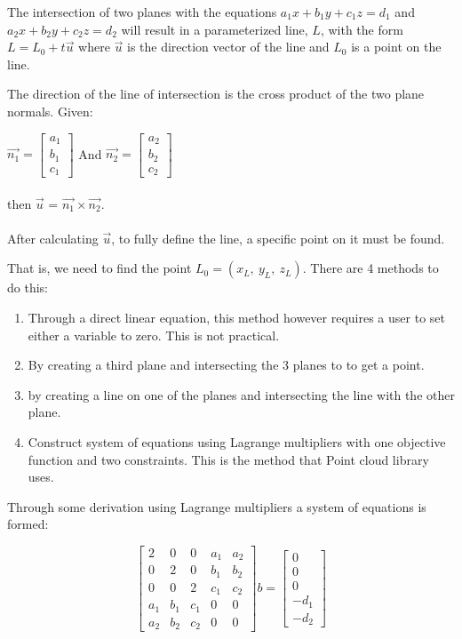 	The intersection of two planes with the equations $a_1x + b_1y + c_1z = d_1$ and $a_2x + b_2y + c_2z = d_2$ will result in a parameterized line, $L$, with the form $L = L_0 + t\vec{u}$ where $\vec{u}$ is the direction vector of the line and $L_0$ is a point on the line.
	
	The direction of the line of intersection is the cross product of the two plane normals. Given:
	
	$\vec{n_1} = \begin{bmatrix}a_1\\b_1\\c_1\end{bmatrix}$  And $\vec{n_2} = \begin{bmatrix}a_2\\b_2\\c_2\end{bmatrix}$\\
	\\
	then $\vec{u}$  =  $\vec{n_1} \times \vec{n_2}  $.\\
	\\
	After calculating $\vec{u}$, to fully define the line, a specific point on it must be found.
	
	That is, we need to find the point $L_0 = (x_L,\:y_L,\:z_L)$. There are 4 methods to do this:
	\begin{enumerate}
	\item Through a direct linear equation, this method however requires a user to set either a variable to zero. This is not practical.
	
	\item By creating a third plane and intersecting the 3 planes to to get a point.
	
	\item by creating a line on one of the planes and intersecting the line with the other plane. 
	
	\item Construct system of equations using Lagrange multipliers with one objective function and two constraints. This is the method that Point cloud library uses.
	\end{enumerate}
	
	Through some derivation using Lagrange multipliers a system of equations is formed:
	
	
	\[
	\begin{bmatrix}
	2 & 0 & 0 & a_1 & a_2 \\
	0 & 2 & 0 & b_1 & b_2 \\
	0 & 0 & 2 & c_1 & c_2 \\
	a_1 & b_1 & c_1 & 0 & 0 \\
	a_2 & b_2 & c_2 & 0 & 0
	\end{bmatrix}
	b=
	\begin{bmatrix}
	0 \\
	0\\
	0 \\
	-d_1 \\
	-d_2 
	\end{bmatrix}
	\]
	
